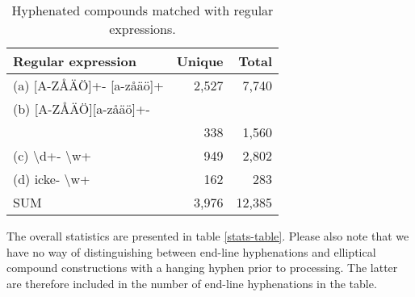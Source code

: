 \begin{table}[t!]
\begin{center}
\begin{tabular}{|l|r|r|}
\hline \textbf{Regular expression} & \textbf{Unique} & \textbf{Total} \\ \hline
(a) {[A-ZÅÄÖ]}+- [a-zåäö]+ & 2,527 & 7,740 \\
(b) {[A-ZÅÄÖ][a-zåäö]+-} & & \\
\hspace{1.4em}{[A-ZÅÄÖ][a-zåäö]+} & 338 & 1,560 \\
(c) \textbackslash d+- \textbackslash w+ & 949 & 2,802 \\
(d) icke- \textbackslash w+ & 162 & 283 \\
\hline
SUM & 3,976 & 12,385 \\
\hline
\end{tabular}
\end{center}
\caption{\label{regex-table} Hyphenated compounds matched with regular expressions. }
\end{table}

The overall statistics are presented in table \ref{stats-table}. Please also note that we have no way of distinguishing between end-line hyphenations and elliptical compound constructions with a hanging hyphen prior to processing. The latter are therefore included in the number of end-line hyphenations in the table.

